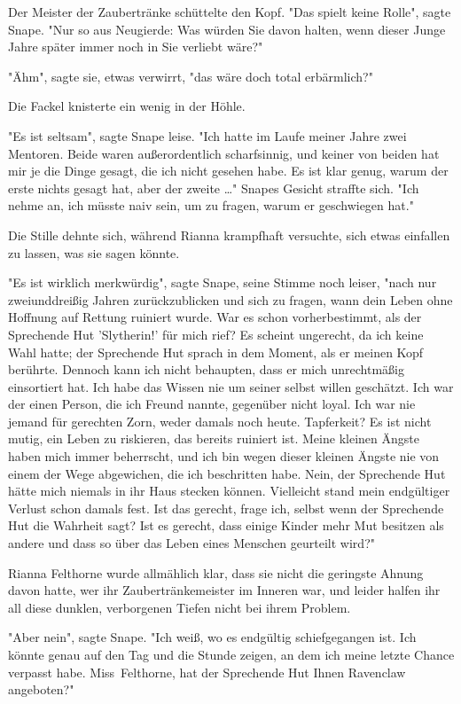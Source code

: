 {Der Meister der Zaubertränke schüttelte den Kopf. "Das spielt keine Rolle", sagte Snape. "Nur so aus Neugierde: Was würden Sie davon halten, wenn dieser Junge Jahre später immer noch in Sie verliebt wäre?"

"Ähm", sagte sie, etwas verwirrt, "das wäre doch total erbärmlich?"

Die Fackel knisterte ein wenig in der Höhle.

"Es ist seltsam", sagte Snape leise. "Ich hatte im Laufe meiner Jahre zwei Mentoren. Beide waren außerordentlich scharfsinnig, und keiner von beiden hat mir je die Dinge gesagt, die ich nicht gesehen habe. Es ist klar genug, warum der erste nichts gesagt hat, aber der zweite …" Snapes Gesicht straffte sich. "Ich nehme an, ich müsste naiv sein, um zu fragen, warum er geschwiegen hat."

Die Stille dehnte sich, während Rianna krampfhaft versuchte, sich etwas einfallen zu lassen, was sie sagen könnte.

"Es ist wirklich merkwürdig", sagte Snape, seine Stimme noch leiser, "nach nur zweiunddreißig Jahren zurückzublicken und sich zu fragen, wann dein Leben ohne Hoffnung auf Rettung ruiniert wurde. War es schon vorherbestimmt, als der Sprechende Hut 'Slytherin!' für mich rief? Es scheint ungerecht, da ich keine Wahl hatte; der Sprechende Hut sprach in dem Moment, als er meinen Kopf berührte. Dennoch kann ich nicht behaupten, dass er mich unrechtmäßig einsortiert hat. Ich habe das Wissen nie um seiner selbst willen geschätzt. Ich war der einen Person, die ich Freund nannte, gegenüber nicht loyal. Ich war nie jemand für gerechten Zorn, weder damals noch heute. Tapferkeit? Es ist nicht mutig, ein Leben zu riskieren, das bereits ruiniert ist. Meine kleinen Ängste haben mich immer beherrscht, und ich bin wegen dieser kleinen Ängste nie von einem der Wege abgewichen, die ich beschritten habe. Nein, der Sprechende Hut hätte mich niemals in ihr Haus stecken können. Vielleicht stand mein endgültiger Verlust schon damals fest. Ist das gerecht, frage ich, selbst wenn der Sprechende Hut die Wahrheit sagt? Ist es gerecht, dass einige Kinder mehr Mut besitzen als andere und dass so über das Leben eines Menschen geurteilt wird?"

Rianna Felthorne wurde allmählich klar, dass sie nicht die geringste Ahnung davon hatte, wer ihr Zaubertränkemeister im Inneren war, und leider halfen ihr all diese dunklen, verborgenen Tiefen nicht bei ihrem Problem.

"Aber nein", sagte Snape. "Ich weiß, wo es endgültig schiefgegangen ist. Ich könnte genau auf den Tag und die Stunde zeigen, an dem ich meine letzte Chance verpasst habe. Miss~Felthorne, hat der Sprechende Hut Ihnen Ravenclaw angeboten?"

}
